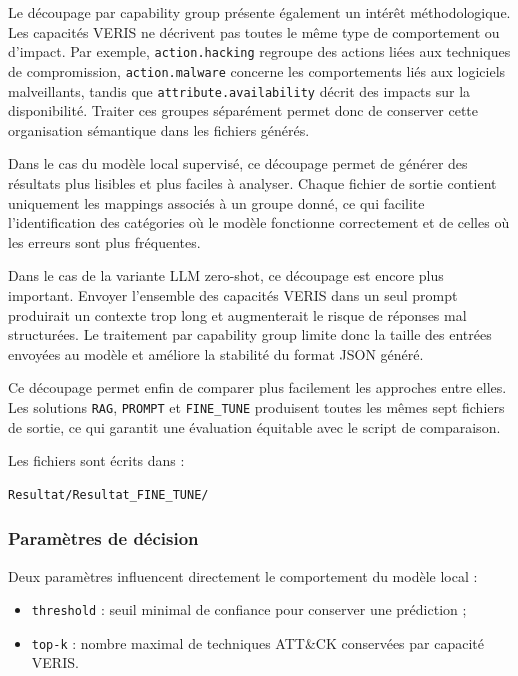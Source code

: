 \documentclass[a4paper,12pt]{article}
\begin{document}
Le découpage par capability group présente également un intérêt méthodologique. Les capacités VERIS ne décrivent pas toutes le même type de comportement ou d'impact. Par exemple, \texttt{action.hacking} regroupe des actions liées aux techniques de compromission, \texttt{action.malware} concerne les comportements liés aux logiciels malveillants, tandis que \texttt{attribute.availability} décrit des impacts sur la disponibilité. Traiter ces groupes séparément permet donc de conserver cette organisation sémantique dans les fichiers générés.

Dans le cas du modèle local supervisé, ce découpage permet de générer des résultats plus lisibles et plus faciles à analyser. Chaque fichier de sortie contient uniquement les mappings associés à un groupe donné, ce qui facilite l'identification des catégories où le modèle fonctionne correctement et de celles où les erreurs sont plus fréquentes.

Dans le cas de la variante LLM zero-shot, ce découpage est encore plus important. Envoyer l'ensemble des capacités VERIS dans un seul prompt produirait un contexte trop long et augmenterait le risque de réponses mal structurées. Le traitement par capability group limite donc la taille des entrées envoyées au modèle et améliore la stabilité du format JSON généré.

Ce découpage permet enfin de comparer plus facilement les approches entre elles. Les solutions \texttt{RAG}, \texttt{PROMPT} et \texttt{FINE\_TUNE} produisent toutes les mêmes sept fichiers de sortie, ce qui garantit une évaluation équitable avec le script de comparaison.

Les fichiers sont écrits dans :

\begin{verbatim}
Resultat/Resultat_FINE_TUNE/
\end{verbatim}

\subsubsection{Paramètres de décision}

Deux paramètres influencent directement le comportement du modèle local :

\begin{itemize}
    \item \texttt{threshold} : seuil minimal de confiance pour conserver une prédiction ;
    \item \texttt{top-k} : nombre maximal de techniques ATT\&CK conservées par capacité VERIS.
\end{itemize}
\end{document}
